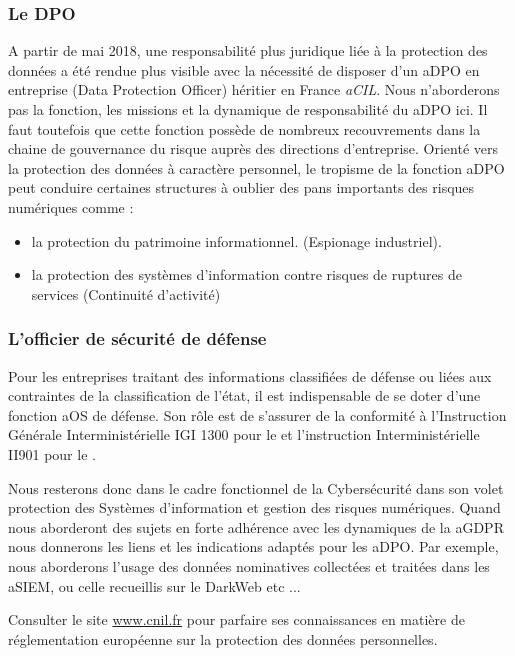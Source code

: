 \subsubsection{Le DPO}

A partir de mai 2018, une responsabilité plus juridique liée à la protection des données a été rendue plus visible avec la nécessité de disposer d'un \gls{aDPO} en entreprise (Data Protection Officer) héritier en France  \textit{\gls{aCIL}}.
Nous n'aborderons pas la fonction, les missions et la dynamique de responsabilité du \gls{aDPO} ici. Il faut toutefois que cette fonction possède de nombreux recouvrements dans la chaine de gouvernance du risque  auprès des directions d'entreprise. Orienté vers la protection des données à caractère personnel, le tropisme de la fonction \gls{aDPO} peut conduire certaines structures à oublier des pans importants des risques numériques comme :

\begin{itemize}
	\item la protection du patrimoine informationnel. (Espionage industriel).
	\item la protection des systèmes d'information contre risques de ruptures de services (Continuité d'activité)
\end{itemize}

\subsubsection{L'officier de sécurité de défense}
Pour les entreprises traitant des informations classifiées de défense ou liées aux contraintes de la classification de l'état, il est indispensable de se doter d'une fonction \gls{aOS} de défense. Son rôle est de s'assurer de la conformité à l'Instruction Générale Interministérielle IGI 1300 pour le  et l'instruction Interministérielle II901 pour le .

Nous resterons donc dans le cadre fonctionnel de la Cybersécurité dans son volet protection des Systèmes d'information et gestion des risques numériques.
Quand nous aborderont des sujets en forte adhérence avec les dynamiques de la \gls{aGDPR} nous donnerons les liens et les indications adaptés pour les \gls{aDPO}.
Par exemple, nous aborderons l'usage des données nominatives collectées et traitées dans les \gls{aSIEM}, ou celle recueillis sur le DarkWeb etc ...
\begin{remark}
Consulter le site \url{www.cnil.fr} pour parfaire ses connaissances en matière de réglementation européenne sur la protection des données personnelles. 
\end{remark}

